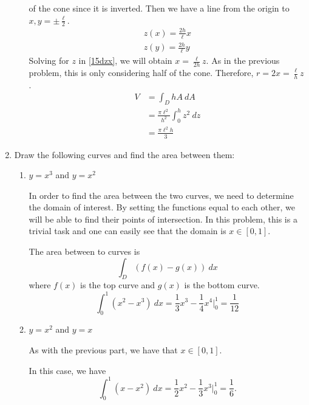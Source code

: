 \begin{enumerate}
\begin{enumerate}[label = (\alph*), ref = \theenumi{(\alph*)}]
    of the cone since it is inverted.
    Then we have a line from the origin to \(x, y = \pm\frac{\ell}{2}\).
    \begin{gather}
      z(x) = \frac{2h}{\ell}x\label{15dzx}\\
      z(y) = \frac{2h}{\ell}y
    \end{gather}
    Solving for \(z\) in \cref{15dzx}, we will obtain \(x = \frac{\ell}{2h}z\).
    As in the previous problem, this is only considering half of the cone.
    Therefore, \(r = 2x = \frac{\ell}{h}z\).
    \begin{align*}
      V &= \int_DhA \ dA\\
        &= \frac{\pi\ell^2}{h^2}\int_0^hz^2 \ dz\\
        &= \frac{\pi\ell^2h}{3}
    \end{align*}
  \end{enumerate}
\item
  Draw the following curves and find the area between them:
  \begin{enumerate}[label = (\alph*)]
  \item
    \(y = x^3\) and \(y = x^2\)
    \par\smallskip
    In order to find the area between the two curves, we need to determine the
    domain of interest.
    By setting the functions equal to each other, we will be able to find their
    points of intersection.
    In this problem, this is a trivial task and one can easily see that the
    domain is \(x\in[0, 1]\).
    \begin{figure}[H]
      \centering
      
      \caption{}
    \end{figure}
    The area between to curves is
    \[
    \int_D(f(x) - g(x)) \ dx
    \]
    where \(f(x)\) is the top curve and \(g(x)\) is the bottom curve.
    \[
    \int_0^1(x^2 - x^3) \ dx = \frac{1}{3}x^3 - \frac{1}{4}x^4\Big|_0^1 =
    \frac{1}{12}
    \]
  \item
    \(y = x^2\) and \(y = x\)
    \par\smallskip
    As with the previous part, we have that \(x\in[0, 1]\).
    \begin{figure}[H]
      \centering
      
      \caption{}
    \end{figure}
    In this case, we have
    \[
    \int_0^1(x - x^2) \ dx = \frac{1}{2}x^2 - \frac{1}{3}x^3\Big|_0^1 =
    \frac{1}{6}.
    \]
  \end{enumerate}

\end{enumerate}
